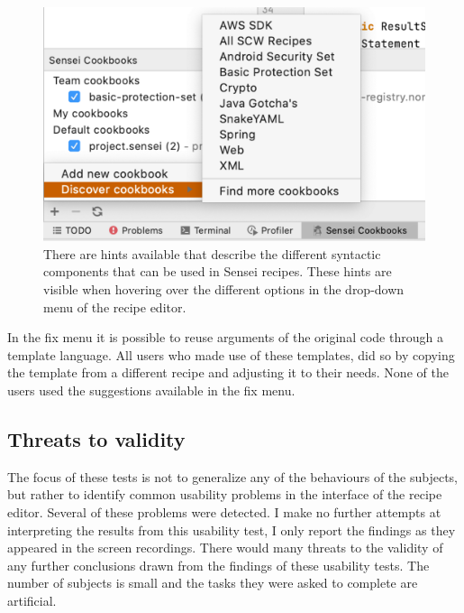 \begin{figure}
  \centering
  \includegraphics[width=\textwidth,page=6]{04-tools/figures/figures1.pdf}
  \caption[Hints for different syntactic components in the recipe editor]{There are hints available that describe the different syntactic components that can be used in Sensei recipes. These hints are visible when hovering over the different options in the drop-down menu of the recipe editor.}
  \label{fig:dropdownhint} 
\end{figure}

In the fix menu it is possible to reuse arguments of the original code through a template language.
All users who made use of these templates, did so by copying the template from a different recipe and adjusting it to their needs.
None of the users used the suggestions available in the fix menu.

\subsection{Threats to validity}
The focus of these tests is not to generalize any of the behaviours of the subjects, but rather to identify common usability problems in the interface of the recipe editor.
Several of these problems were detected.
I make no further attempts at interpreting the results from this usability test, I only report the findings as they appeared in the screen recordings.
There would many threats to the validity of any further conclusions drawn from the findings of these usability tests.
The number of subjects is small and the tasks they were asked to complete are artificial.